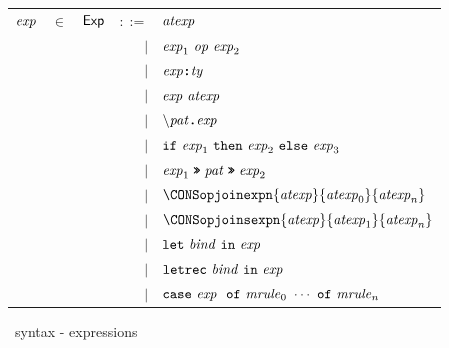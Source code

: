 \documentclass[final]{article}
\begin{document}
\begin{figure}[t]
\begin{small}
\begin{center}
\begin{tabular}{lllrl}
    $\mathit{exp}$
    & $\in$
    & $\mathsf{Exp}$
    & $::=$
    & $\mathit{atexp}$
    \\
    &&& $\mid$
    & $\mathit{exp}_1\ \mathit{op}\ \mathit{exp}_2$
    \\
    &&& $\mid$
    & $\mathit{exp} \textbf{\texttt{:}} \mathit{ty}$
    \\
    &&& $\mid$
    & $\mathit{exp}\ \mathit{atexp}$
    \\
    &&& $\mid$
    & $\textbf{\texttt{$\backslash$}}\mathit{pat}\textbf{\texttt{.}}\mathit{exp}$
    \\
    &&& $\mid$
    & $\mathtt{if}\ \mathit{exp}_1\ \mathtt{then}\ \mathit{exp}_2\ \mathtt{else}\ \mathit{exp}_3$
    \\
    &&& $\mid$
    & $\mathit{exp}_1\mathrel{\textbf{\texttt{>>}}}\mathit{pat}\mathrel{\textbf{\texttt{>>}}}\mathit{exp}_2$
    \\
    &&& $\mid$
    & $\CONSopjoinexpn{\METAatexp}{\METAatexp_0}{\METAatexp_n}$
    \\
    &&& $\mid$
    & $\CONSopjoinsexpn{\METAatexp}{\METAatexp_1}{\METAatexp_n}$
    \\
    &&& $\mid$
    & $\mathtt{let}\ \mathit{bind}\ \mathtt{in}\ \mathit{exp}$
    \\
    &&& $\mid$
    & $\mathtt{letrec}\ \mathit{bind}\ \mathtt{in}\ \mathit{exp}$
    \\
    &&& $\mid$
    & $\mathtt{case}\ \mathit{exp}\ \ \mathtt{of}\ \mathit{mrule}_0\ \cdots\ \mathtt{of}\ \mathit{mrule}_n$
    \\
  \end{tabular}
\end{center}
\caption{\eml\ syntax - expressions}
\label{fig:esharp-syntax-expressions}
\end{small}
\end{figure}
\end{document}
